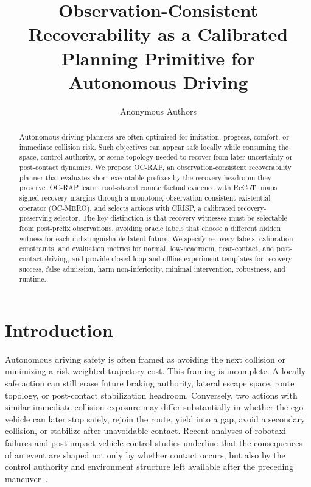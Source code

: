 \documentclass[conference]{IEEEtran}
\title{Observation-Consistent Recoverability as a Calibrated Planning Primitive for Autonomous Driving}
\author{Anonymous Authors}
\begin{document}
\maketitle

\begin{abstract}
Autonomous-driving planners are often optimized for imitation, progress, comfort, or immediate collision risk.  Such objectives can appear safe locally while consuming the space, control authority, or scene topology needed to recover from later uncertainty or post-contact dynamics.  We propose OC-RAP, an observation-consistent recoverability planner that evaluates short executable prefixes by the recovery headroom they preserve.  OC-RAP learns root-shared counterfactual evidence with ReCoT, maps signed recovery margins through a monotone, observation-consistent existential operator (OC-MERO), and selects actions with CRISP, a calibrated recovery-preserving selector.  The key distinction is that recovery witnesses must be selectable from post-prefix observations, avoiding oracle labels that choose a different hidden witness for each indistinguishable latent future.  We specify recovery labels, calibration constraints, and evaluation metrics for normal, low-headroom, near-contact, and post-contact driving, and provide closed-loop and offline experiment templates for recovery success, false admission, harm non-inferiority, minimal intervention, robustness, and runtime.
\end{abstract}

\section{Introduction}
Autonomous driving safety is often framed as avoiding the next collision or minimizing a risk-weighted trajectory cost.  This framing is incomplete.  A locally safe action can still erase future braking authority, lateral escape space, route topology, or post-contact stabilization headroom.  Conversely, two actions with similar immediate collision exposure may differ substantially in whether the ego vehicle can later stop safely, rejoin the route, yield into a gap, avoid a secondary collision, or stabilize after unavoidable contact.  Recent analyses of robotaxi failures and post-impact vehicle-control studies underline that the consequences of an event are shaped not only by whether contact occurs, but also by the control authority and environment structure left available after the preceding maneuver~\cite{koopman2024anatomy,yang2025post,ghosh2026post}.
\end{document}
